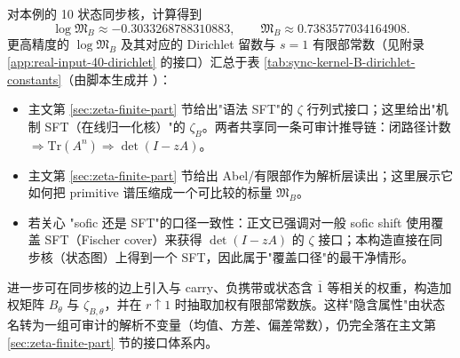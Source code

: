 对本例的 10 状态同步核，计算得到
\[
\log \mathfrak{M}_B\approx -0.3033268788310883,
\qquad
\mathfrak{M}_B\approx 0.7383577034164908.
\]
更高精度的 $\log\mathfrak{M}_B$ 及其对应的 Dirichlet 留数与 $s=1$ 有限部常数（见附录 \ref{app:real-input-40-dirichlet} 的接口）汇总于表 \ref{tab:sync-kernel-B-dirichlet-constants}（由脚本生成并 \verb||）：


\begin{remark}
\begin{itemize}
  \item 主文第 \ref{sec:zeta-finite-part} 节给出"语法 SFT"的 $\zeta$ 行列式接口；这里给出"机制 SFT（在线归一化核）"的 $\zeta_B$。两者共享同一条可审计推导链：闭路径计数 $\Rightarrow \mathrm{Tr}(A^n) \Rightarrow \det(I-zA)$。
  \item 主文第 \ref{sec:zeta-finite-part} 节给出 Abel/有限部作为解析层读出；这里展示它如何把 primitive 谱压缩成一个可比较的标量 $\mathfrak{M}_B$。
  \item 若关心 "sofic 还是 SFT"的口径一致性：正文已强调对一般 sofic shift 使用覆盖 SFT（Fischer cover）来获得 $\det(I-zA)$ 的 $\zeta$ 接口；本构造直接在同步核（状态图）上得到一个 SFT，因此属于"覆盖口径"的最干净情形。
\end{itemize}
\end{remark}

\begin{remark}
进一步可在同步核的边上引入与 carry、负携带或状态含 $\overline{1}$ 等相关的权重，构造加权矩阵 $B_\theta$ 与 $\zeta_{B,\theta}$，并在 $r\uparrow 1$ 时抽取加权有限部常数族。这样"隐含属性"由状态名转为一组可审计的解析不变量（均值、方差、偏差常数），仍完全落在主文第 \ref{sec:zeta-finite-part} 节的接口体系内。
\end{remark}
